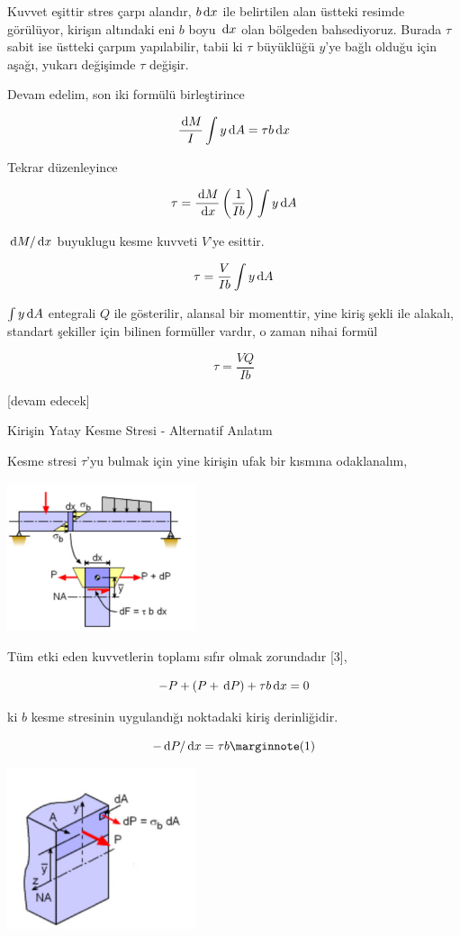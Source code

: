 \documentclass[12pt,fleqn]{article}\usepackage{../../common}
\begin{document}
Kuvvet eşittir stres çarpı alandır, $b \,\mathrm{d} x$ ile belirtilen alan üstteki
resimde görülüyor, kirişın altındaki eni $b$ boyu $\,\mathrm{d} x$ olan bölgeden
bahsediyoruz. Burada $\tau$ sabit ise üstteki çarpım yapılabilir, tabii ki
$\tau$ büyüklüğü $y$'ye bağlı olduğu için aşağı, yukarı değişimde $\tau$
değişir.

Devam edelim, son iki formülü birleştirince

$$
\frac{\,\mathrm{d} M}{I} \int y \,\mathrm{d} A = \tau b \,\mathrm{d} x
$$

Tekrar düzenleyince

$$
\tau = \frac{\,\mathrm{d} M}{\,\mathrm{d} x} \left( \frac{1}{Ib}  \right) \int y \,\mathrm{d} A
$$

$\,\mathrm{d} M / \,\mathrm{d} x$ buyuklugu kesme kuvveti $V$'ye esittir. 

$$
\tau =  \frac{V}{Ib} \int y \,\mathrm{d} A
$$

$\int y \,\mathrm{d} A$ entegrali $Q$ ile gösterilir, alansal bir momenttir, yine kiriş
şekli ile alakalı, standart şekiller için bilinen formüller vardır, o zaman
nihai formül

$$
\tau =  \frac{VQ}{Ib}
$$

[devam edecek]

Kirişin Yatay Kesme Stresi - Alternatif Anlatım

Kesme stresi $\tau$'yu bulmak için yine kirişin ufak bir kısmına odaklanalım,

\includegraphics[width=15em]{phy_020_strs_01_05.jpg}

Tüm etki eden kuvvetlerin toplamı sıfır olmak zorundadır [3],

$$
-P + (P + \,\mathrm{d} P) + \tau b \,\mathrm{d} x = 0
$$

ki $b$ kesme stresinin uygulandığı noktadaki kiriş derinliğidir. 

$$
-\ud P/\ud x = \tau b
\mlabel{1}
$$

\includegraphics[width=15em]{phy_020_strs_00_01.jpg}
\end{document}
